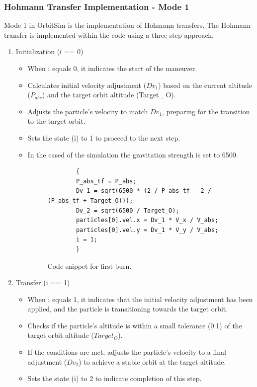 \documentclass[12pt, letter]{article}
\begin{document}
\subsubsection{Hohmann Transfer Implementation - Mode 1}
Mode 1 in OrbitSim is the implementation of Hohmann transfers.
The Hohmann transfer is implemented within the code using a three step approach.

\begin{enumerate}
    \item Initialization (i == 0)
    \begin{itemize}
        \item When i equals 0, it indicates the start of the maneuver.
        \item Calculates initial velocity adjustment ($Dv_1$) based on the current altitude ($P_{abs}$) and the target orbit altitude (Target $\_$ O).
        \item Adjusts the particle's velocity to match $Dv_1$, preparing for the transition to the target orbit.
        \item Sets the state (i) to 1 to proceed to the next step.
        \item In the cased of the simulation the gravitation strength is set to 6500.
        \begin{figure}[H]
        \begin{verbatim}
        {
        P_abs_tf = P_abs;
        Dv_1 = sqrt(6500 * (2 / P_abs_tf - 2 / (P_abs_tf + Target_O)));
        Dv_2 = sqrt(6500 / Target_O);
        particles[0].vel.x = Dv_1 * V_x / V_abs;
        particles[0].vel.y = Dv_1 * V_y / V_abs;
        i = 1;
        }  
        \end{verbatim}
        \caption{Code snippet for first burn.}
        \label{fig:class_particle}
        \end{figure}
    \end{itemize}

    \item Transfer (i == 1)
    \begin{itemize}
        \item When i equals 1, it indicates that the initial velocity adjustment has been applied, and the particle is transitioning towards the target orbit.
        \item Checks if the particle's altitude is within a small tolerance (0.1) of the target orbit altitude ($Target_O$).
        \item If the conditions are met, adjusts the particle's velocity to a final adjustment ($Dv_2$) to achieve a stable orbit at the target altitude.
        \item Sets the state (i) to 2 to indicate completion of this step.



\end{itemize}
\end{enumerate}
\end{document}
